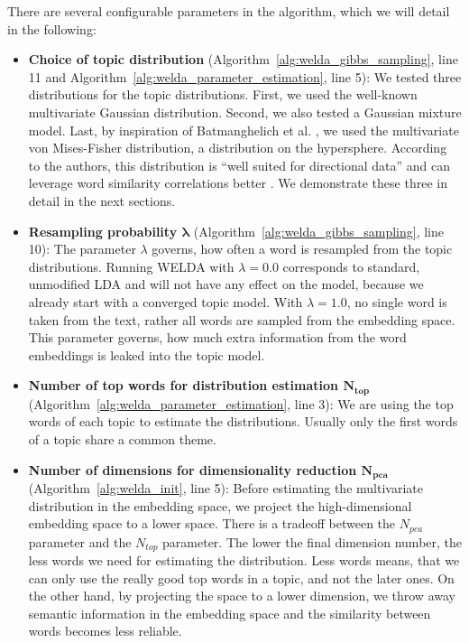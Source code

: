 \documentclass[
        a4paper,
        titlepage,
        twoside,
        parskip,
        numbers=noenddot
        ]{scrbook}
\theoremstyle{break}
\begin{document}
There are several configurable parameters in the algorithm, which we will detail in the following:
\begin{itemize}
  \item \textbf{Choice of topic distribution} (Algorithm~\ref{alg:welda_gibbs_sampling}, line 11 and Algorithm~\ref{alg:welda_parameter_estimation}, line 5):
    We tested three distributions for the topic distributions.
    First, we used the well-known multivariate Gaussian distribution.
    Second, we also tested a Gaussian mixture model.
    Last, by inspiration of Batmanghelich et al. \cite{Batmanghelich2016}, we used the multivariate von Mises-Fisher distribution, a distribution on the hypersphere.
    According to the authors, this distribution is ``well suited for directional data'' and can leverage word similarity correlations better \cite{Batmanghelich2016}.
    We demonstrate these three in detail in the next sections.
  \item \textbf{Resampling probability $\boldsymbol{\lambda}$} (Algorithm~\ref{alg:welda_gibbs_sampling}, line 10):
    The parameter $\lambda$ governs, how often a word is resampled from the topic distributions.
    Running WELDA with $\lambda = 0.0$ corresponds to standard, unmodified LDA and will not have any effect on the model, because we already start with a converged topic model.
    With $\lambda = 1.0$, no single word is taken from the text, rather all words are sampled from the embedding space.
    This parameter governs, how much extra information from the word embeddings is leaked into the topic model.
  \item \textbf{Number of top words for distribution estimation $\boldsymbol{N_{top}}$} (Algorithm~\ref{alg:welda_parameter_estimation}, line 3):
    We are using the top words of each topic to estimate the distributions.
    Usually only the first words of a topic share a common theme.
  \item \textbf{Number of dimensions for dimensionality reduction $\boldsymbol{N_{pca}}$} (Algorithm~\ref{alg:welda_init}, line 5):
    Before estimating the multivariate distribution in the embedding space, we project the high-dimensional embedding space to a lower space.
    There is a tradeoff between the $N_{pca}$ parameter and the $N_{top}$ parameter.
    The lower the final dimension number, the less words we need for estimating the distribution.
    Less words means, that we can only use the really good top words in a topic, and not the later ones.
    On the other hand, by projecting the space to a lower dimension, we throw away semantic information in the embedding space and the similarity between words becomes less reliable.

\end{itemize}
\end{document}
